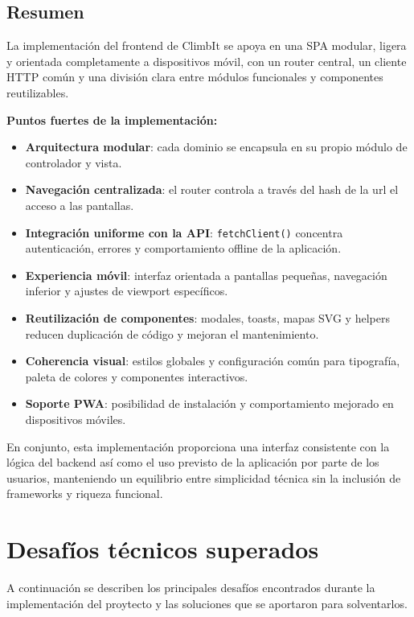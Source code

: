 \subsection{Resumen}

La implementación del frontend de ClimbIt se apoya en una SPA modular, ligera y orientada completamente a dispositivos móvil, con un router central, un cliente HTTP común y una división clara entre módulos funcionales y componentes reutilizables.

\textbf{Puntos fuertes de la implementación:}

\begin{itemize}
  \item \textbf{Arquitectura modular}: cada dominio se encapsula en su propio módulo de controlador y vista.
  \item \textbf{Navegación centralizada}: el router controla a través del hash de la url el acceso a las pantallas.
  \item \textbf{Integración uniforme con la API}: \texttt{fetchClient()} concentra autenticación, errores y comportamiento offline de la aplicación.
  \item \textbf{Experiencia móvil}: interfaz orientada a pantallas pequeñas, navegación inferior y ajustes de viewport específicos.
  \item \textbf{Reutilización de componentes}: modales, toasts, mapas SVG y helpers reducen duplicación de código y mejoran el mantenimiento.
  \item \textbf{Coherencia visual}: estilos globales y configuración común para tipografía, paleta de colores y componentes interactivos.
  \item \textbf{Soporte PWA}: posibilidad de instalación y comportamiento mejorado en dispositivos móviles.
\end{itemize}

En conjunto, esta implementación proporciona una interfaz consistente con la lógica del backend así como el uso previsto de la aplicación por parte de los usuarios, manteniendo un equilibrio entre simplicidad técnica sin la inclusión de frameworks y riqueza funcional.

\section{Desafíos técnicos superados}

A continuación se describen los principales desafíos encontrados durante la implementación del proytecto y las soluciones que se aportaron para solventarlos.


